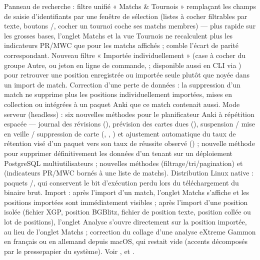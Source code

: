 \documentclass[letterpaper,10pt,french]{sphinxmanual}
\begin{document}
\begin{savenotes}
\begin{longtable}{}
\begin{varwidth}[t]{}
Panneau de recherche : filtre unifié « Matchs \& Tournois » remplaçant les champs de saisie d’identifiants par une fenêtre de sélection (listes à cocher filtrables par texte, boutons /, cocher un tournoi coche ses matchs membres) — plus rapide sur les grosses bases, l’onglet Matchs et la vue Tournois ne recalculent plus les indicateurs PR/MWC que pour les matchs affichés ;  comble l’écart de parité correspondant. Nouveau filtre « Importée individuellement » (case à cocher du groupe Autre, ou jeton  en ligne de commande,  ; disponible aussi en CLI via ) pour retrouver une position enregistrée ou importée seule plutôt que noyée dans un import de match. Correction d’une perte de données : la suppression d’un match ne supprime plus les positions individuellement importées, mises en collection ou intégrées à un paquet Anki que ce match contenait aussi. Mode serveur (headless) : six nouvelles méthodes pour le planificateur Anki à répétition espacée — journal des révisions (), prévision des cartes dues (), suspension / mise en veille / suppression de carte (, , ) et ajustement automatique du taux de rétention visé d’un paquet vers son taux de réussite observé () ; nouvelle méthode  pour supprimer définitivement les données d’un tenant sur un déploiement PostgreSQL multi\sphinxhyphen{}utilisateurs ; nouvelles méthodes  (filtrage/tri/pagination) et  (indicateurs PR/MWC bornés à une liste de matchs). Distribution Linux native : paquets /, qui conservent le bit d’exécution perdu lors du téléchargement du binaire brut. Import : après l’import d’un match, l’onglet Matchs s’affiche et les positions importées sont immédiatement visibles ; après l’import d’une position isolée (fichier XGP, position BGBlitz, fichier de position texte, position collée ou lot de positions), l’onglet Analyse s’ouvre directement sur la position importée, au lieu de l’onglet Matchs ; correction du collage d’une analyse eXtreme Gammon en français ou en allemand depuis macOS, qui restait vide (accents décomposés par le presse\sphinxhyphen{}papier du système). Voir {\hyperref[\detokenize{mode_headless:headless}]{}}, {\hyperref[\detokenize{cmd_mode:cmd-mode}]{}} et {\hyperref[\detokenize{telecharge_install:telecharge-install}]{}}.

\end{varwidth}
\end{longtable}
\end{savenotes}
\end{document}
